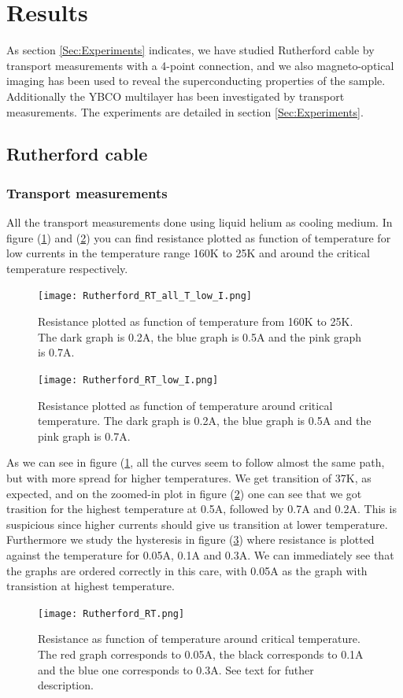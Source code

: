 \documentclass{comjnl}
\begin{document}
\section{Results}\label{Sec:Results}
As section \ref{Sec:Experiments} indicates, we have studied Rutherford cable by transport measurements with a 4-point connection, and we also magneto-optical imaging has been used to reveal the superconducting properties of the sample. Additionally the YBCO multilayer has been investigated by transport measurements. The experiments are detailed in section \ref{Sec:Experiments}.

\subsection{Rutherford cable}
\subsubsection{Transport measurements}
All the transport measurements done using liquid helium as cooling medium. In figure (\ref{fig:rutherfordRTallI}) and (\ref{fig:rutherfordRTlowI}) you can find resistance plotted as function of temperature for low currents in the temperature range 160K to 25K and around the critical temperature respectively. 
\begin{figure}[h]
\centering
\texttt{[image: Rutherford\_RT\_all\_T\_low\_I.png]}
\caption{Resistance plotted as function of temperature from 160K to 25K. The dark graph is 0.2A, the blue graph is 0.5A and the pink graph is 0.7A. \label{fig:rutherfordRTallI}}
\end{figure}
\begin{figure}[h]
\centering
\texttt{[image: Rutherford\_RT\_low\_I.png]}
\caption{Resistance plotted as function of temperature around critical temperature. The dark graph is 0.2A, the blue graph is 0.5A and the pink graph is 0.7A. \label{fig:rutherfordRTlowI}}
\end{figure}
As we can see in figure (\ref{fig:rutherfordRTallI}, all the curves seem to follow almost the same path, but with more spread for higher temperatures. We get transition of 37K, as expected, and on the zoomed-in plot in figure (\ref{fig:rutherfordRTlowI}) one can see that we got trasition for the highest temperature at 0.5A, followed by 0.7A and 0.2A. This is suspicious since higher currents should give us transition at lower temperature. Furthermore we study the hysteresis in figure (\ref{fig:rutherfordRT}) where resistance is plotted against the temperature for 0.05A, 0.1A and 0.3A. We can immediately see that the graphs are ordered correctly in this care, with 0.05A as the graph with transistion at highest temperature.
\begin{figure}[h]
\centering
\texttt{[image: Rutherford\_RT.png]}
\caption{Resistance as function of temperature around critical temperature. The red graph corresponds to 0.05A, the black corresponds to 0.1A and the blue one corresponds to 0.3A. See text for futher description. \label{fig:rutherfordRT}}
\end{figure}
\end{document}
